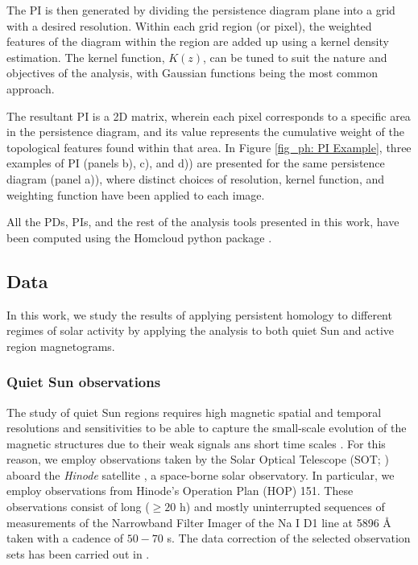 \documentclass[12pt]{mythesis}
\begin{document}
The PI is then generated by dividing the persistence diagram plane into a grid with a desired resolution. Within each grid region (or pixel), the weighted features of the diagram within the region are added up using a kernel density estimation. The kernel function, $K (z)$, can be tuned to suit the nature and objectives of the analysis, with Gaussian functions being the most common approach. 

The resultant PI is a 2D matrix, wherein each pixel corresponds to a specific area in the persistence diagram, and its value represents the cumulative weight of the topological features found within that area. In Figure \ref{fig_ph: PI Example}, three examples of PI (panels b), c), and d)) are presented for the same persistence diagram (panel a)), where distinct choices of resolution, kernel function, and weighting function have been applied to each image.




All the PDs, PIs, and the rest of the analysis tools presented in this work, have been computed using the Homcloud python package \citep{homcloud}.


\subsection{Data}

In this work, we study the results of applying persistent homology to different regimes of solar activity by applying the analysis to both quiet Sun and active region magnetograms.

\subsubsection{Quiet Sun observations}

The study of quiet Sun regions requires high magnetic spatial and temporal resolutions and sensitivities to be able to capture the small-scale evolution of the magnetic structures due to their weak signals ans short time scales \citep{quiet_sun_living_review}. For this reason, we employ observations taken by the Solar Optical Telescope (SOT; \citealt{sot}) aboard the \textit{Hinode} satellite \citep{Hinode}, a space-borne solar observatory. In particular, we employ observations from Hinode's Operation Plan (HOP) 151. These observations consist of long ($\ge 20$ h) and mostly uninterrupted sequences of measurements of the Narrowband Filter Imager of the Na I D1 line at 5896 \r{A} taken with a cadence of $50-70$ s. The data correction of the selected observation sets has been carried out in \citep{gosic}.
\end{document}
